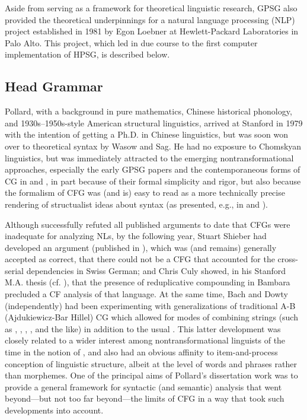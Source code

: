 \documentclass[output=paper]{langsci/langscibook}
\begin{document}
Aside from serving as a framework for theoretical linguistic research, GPSG also provided the theoretical underpinnings for a natural language processing (NLP) project established in 1981 by Egon Loebner at Hewlett-Packard Laboratories in Palo Alto. This project, which led in due course to the first computer implementation of HPSG, is described below.

\subsection{Head Grammar}

Pollard, with a background in pure mathematics, Chinese historical phonology, and 1930s--1950s-style American structural linguistics, arrived at Stanford in 1979 with the intention of getting a Ph.D. in Chinese linguistics, but was soon won over to theoretical syntax by Wasow and Sag. He had no exposure to Chomskyan linguistics, but was immediately attracted to the emerging nontransformational approaches, especially the early GPSG papers and the contemporaneous forms of CG in \citet{Bach79a,Bach80a} and \citet{Dowty82a-u,Dowty82b}, in part because of their formal simplicity and rigor, but also because the formalism of CFG was (and is) easy to read as a more technically precise rendering of structualist ideas about syntax (as presented, e.g., in \citet{Bloomfield33-u} and \citet{Hockett1958}).

Although \citet{PG82a-u} successfully refuted all published arguments to date that CFGs were inadequate for analyzing NLs, by the following year, Stuart Shieber had developed an argument (published in \citet{Shieber85a}), which was (and remains) generally accepted as correct, that there could not be a CFG that accounted for the cross-serial dependencies in Swiss German; and Chris Culy showed, in his Stanford M.A. thesis (cf. \citet{Culy85a}), that the presence of reduplicative compounding in Bambara precluded a CF analysis of that language. At the same time, Bach and Dowty (independently) had been experimenting with generalizations of traditional A-B (Ajdukiewicz-Bar Hillel) CG which allowed for modes of combining strings (such as , , , , and the like) in addition to the usual . This latter development was closely related to a wider interest among nontransformational linguists of the time in the notion of , and also had an obvious affinity to  item-and-process conception of linguistic structure, albeit at the level of words and phrases rather than morphemes. One of the principal aims of Pollard's dissertation work was to provide a general framework for syntactic (and semantic) analysis that went beyond---but not too far beyond---the limits of CFG in a way that took such developments into account. 
\end{document}
